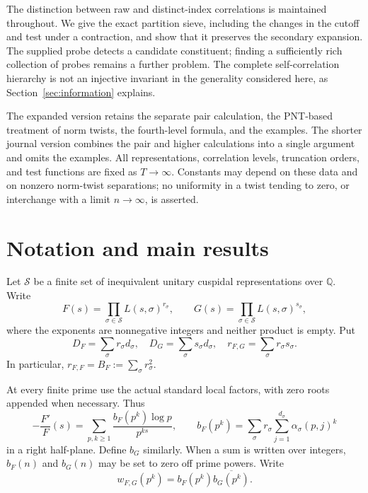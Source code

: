 \documentclass[11pt]{article}
\numberwithin{equation}{section}
\theoremstyle{remark}
\newcommand{\Q}{\mathbb Q}
\begin{document}
The distinction between raw and distinct-index correlations is
maintained throughout. We give the exact partition sieve, including
the changes in the cutoff and test under a contraction, and show
that it preserves the secondary expansion. The supplied probe detects
a candidate constituent; finding a sufficiently rich collection of
probes remains a further problem. The complete self-correlation
hierarchy is not an injective invariant in the generality considered
here, as Section~\ref{sec:information} explains.

The expanded version retains the separate pair calculation, the
PNT-based treatment of norm twists, the fourth-level formula, and the
examples. The shorter journal version combines the pair and higher
calculations into a single argument and omits the examples. All
representations, correlation levels, truncation orders, and test
functions are fixed as $T\to\infty$. Constants may depend on these
data and on nonzero norm-twist separations; no uniformity in a twist
tending to zero, or interchange with a limit $n\to\infty$, is asserted.

\section{Notation and main results}

Let $\mathcal S$ be a finite set of inequivalent unitary cuspidal
representations over $\Q$. Write
\begin{equation}\label{eq:products}
 F(s)=\prod_{\sigma\in\mathcal S}L(s,\sigma)^{r_\sigma},
 \qquad G(s)=\prod_{\sigma\in\mathcal S}L(s,\sigma)^{s_\sigma},
\end{equation}
where the exponents are nonnegative integers and neither product is
empty. Put
\begin{equation}\label{eq:degrees}
 D_F=\sum_\sigma r_\sigma d_\sigma,\quad
 D_G=\sum_\sigma s_\sigma d_\sigma,\quad
 r_{F,G}=\sum_\sigma r_\sigma s_\sigma.
\end{equation}
In particular, $r_{F,F}=B_F:=\sum_\sigma r_\sigma^2$.

At every finite prime use the actual standard local factors, with zero
roots appended when necessary. Thus
\begin{equation}\label{eq:coefficients}
 -\frac{F'}F(s)=\sum_{p,k\geq1}
  \frac{b_F(p^k)\log p}{p^{ks}},\qquad
 b_F(p^k)=\sum_\sigma r_\sigma\sum_{j=1}^{d_\sigma}
                    \alpha_\sigma(p,j)^k
\end{equation}
in a right half-plane. Define $b_G$ similarly. When a sum is written over
integers, $b_F(n)$ and $b_G(n)$ may be set to zero off prime powers.
Write
\[
 w_{F,G}(p^k)=b_F(p^k)\overline{b_G(p^k)}.
\]
\end{document}
